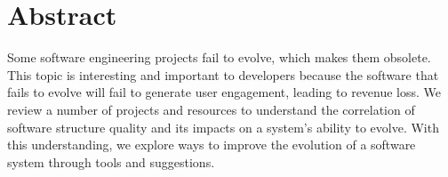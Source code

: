 \section*{Abstract} \label{sectionAbstract}

Some software engineering projects fail to evolve, which makes them obsolete.
This topic is interesting and important to developers because the software that fails to evolve will fail to generate user engagement, leading to revenue loss.
We review a number of projects and resources to understand the correlation of software structure quality and its impacts on a system's ability to evolve.
With this understanding, we explore ways to improve the evolution of a software system through tools and suggestions.

